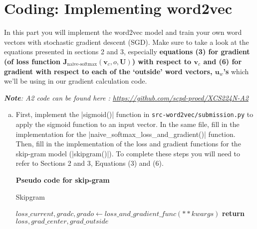 \section{Coding: Implementing word2vec}
In this part you will implement the word2vec model and train your own word vectors with stochastic gradient descent (SGD). Make sure to take a look at the equations presented in sections 2 and 3, especially \textbf{equations (3) for gradient (of loss function $\bm J_{\text{naive-softmax}}(\bm v_c, o, \bm U)$) with respect to $\bm v_c$ and (6) for gradient with respect to each of the `outside' word vectors, $\bm u_w$'s} which we'll be using in our gradient calculation code. 

\textit{\textbf{Note}: A2 code can be found here : \url{https://github.com/scpd-proed/XCS224N-A2}}

\begin{enumerate}[(a)]
    \item {} First, implement the |sigmoid()| function in \texttt{src-word2vec/submission.py} to apply the sigmoid function to an input vector. In the same file, fill in the implementation for the |naive_softmax_loss_and_gradient()| function. Then, fill in the implementation of the loss and gradient functions for the skip-gram model (|skipgram()|).\newline
    To complete these steps you will need to refer to Sections 2 and 3, Equations (3) and (6).\newline
    
    \textbf{Pseudo code for skip-gram}
    
    \begin{algorithm}
    \caption{Skipgram}
    \begin{algorithmic}
        
        
            \State $loss\_current, gradc, grado \gets loss\_and\_gradient\_func(**kwargs)$
                    \EndFor
    \State \textbf{return} $loss, grad\_center, grad\_outside$\EndProcedure
    \end{algorithmic}
    \end{algorithm}


\end{enumerate}
